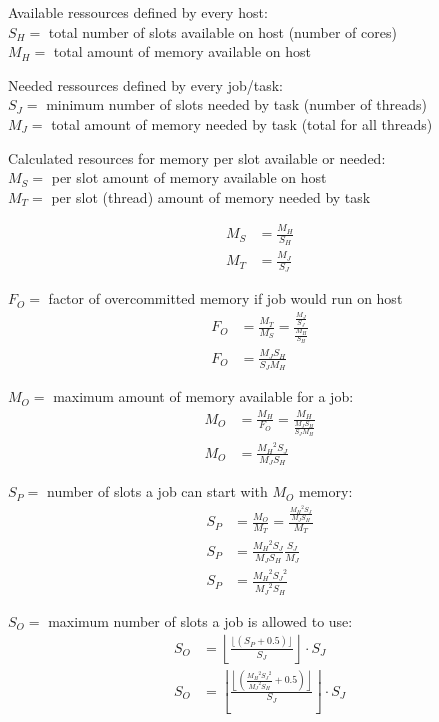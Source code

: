 \documentclass{article}
\begin{document}
Available ressources defined by every host:\\
\(S_H =\) total number of slots available on host (number of cores)\\
\(M_H =\) total amount of memory available on host

Needed ressources defined by every job/task:\\
\(S_J =\) minimum number of slots needed by task (number of threads)\\
\(M_J =\) total amount of memory needed by task (total for all threads)

Calculated resources for memory per slot available or needed:\\
\(M_S =\) per slot amount of memory available on host\\
\(M_T =\) per slot (thread)  amount of memory needed by task

\begin{align}
M_S &= \frac{M_H}{S_H}\\
M_T &= \frac{M_J}{S_J}
\end{align}

\(F_O =\) factor of overcommitted memory if job would run on host
\begin{equation}
\begin{split}
F_O &= \frac{M_T}{M_S} = \frac{\frac{M_J}{S_J}}{\frac{M_H}{S_H}}\\
F_O &= \frac{M_J S_H}{S_J M_H}
\end{split}
\end{equation}

\(M_O = \) maximum amount of memory available for a job:
\begin{equation}
\begin{split}
M_O &= \frac{M_H}{F_O} = \frac{M_H}{\frac{M_J S_H}{S_J M_H}}\\
M_O &= \frac{{M_H}^2 S_J}{M_J S_H}
\end{split}
\end{equation}

\(S_P = \) number of slots a job can start with \(M_O\) memory:
\begin{equation}
\begin{split}
S_P &= \frac{M_O}{M_T} = \frac{\frac{{M_H}^2 S_J}{M_J S_H}}{M_T}\\
S_P &= \frac{{M_H}^2 S_J}{M_J S_H} \frac{S_J}{M_J}\\
S_P &= \frac{{M_H}^2 {S_J}^2}{{M_J}^2 S_H}
\end{split}
\end{equation}

\(S_O = \) maximum number of slots a job is allowed to use:
\begin{equation}
\begin{split}
S_O &= \left \lfloor \frac{\lfloor (S_P + 0.5) \rfloor}{S_J} \right\rfloor \cdot S_J\\
S_O &= \left \lfloor \frac{\left\lfloor\left(\frac{{M_H}^2 {S_J}^2}{{M_J}^2 S_H} + 0.5 \right)\right\rfloor}{S_J} \right\rfloor \cdot S_J
\end{split}
\end{equation}
\end{document}
